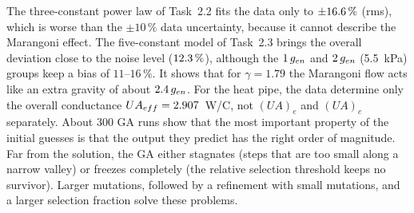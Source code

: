 \documentclass[11pt]{article}
\begin{document}
The three-constant power law of Task~2.2 fits the data only to $\pm16.6\,\%$ (rms), which is
worse than the $\pm10\,\%$ data uncertainty, because it cannot describe the Marangoni effect. The
five-constant model of Task~2.3 brings the overall deviation close to the noise level ($12.3\,\%$),
although the $1\,g_{en}$ and $2\,g_{en}$ (5.5~kPa) groups keep a bias of $11$--$16\,\%$.
It shows that for $\gamma=1.79$ the Marangoni flow acts like an extra gravity of about $2.4\,g_{en}$. For the
heat pipe, the data determine only the overall conductance $UA_{eff}=2.907$~W/\textdegree C, not $(UA)_e$ and
$(UA)_c$ separately. About 300 GA runs show that the most important property of the initial guesses is
that the output they predict has the right order of magnitude. Far from the solution, the GA either
stagnates (steps that are too small along a narrow valley) or freezes completely (the relative selection
threshold keeps no survivor). Larger mutations, followed by a refinement with small mutations, and a
larger selection fraction solve these problems.

\tableofcontents
\newpage









\appendix

\end{document}
